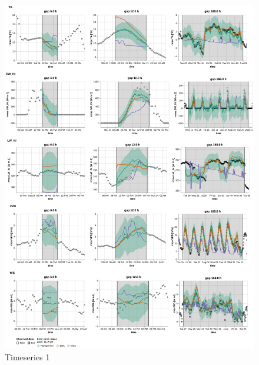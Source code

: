 \documentclass{article}
\newcommand{\imgwidth}{6in}
\begin{document}
\begin{figure}
\centerline{\includegraphics[width=\imgwidth]{timeseries_1_1}}
\caption{Timeseries 1}
\label{fig:ts_1_1}
\end{figure}
\end{document}
